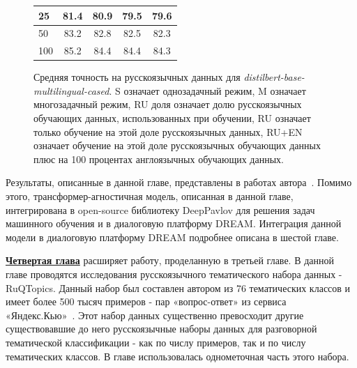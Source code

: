 \begin{figure}[!htbp]
\begin{minipage}{0.45\textwidth}
{{\begin{tabular}[baseline={(0,2.1)}]{|l||c|c|c|c|}
25 & 81.4 & 80.9 & 79.5 & 79.6 \\ \hline
50 & 83.2 & 82.8 & 82.5 & 82.3 \\ \hline
100 & 85.2 & 84.4 & 84.4 & 84.3 \\ \hline
\end{tabular}}
}
\end{minipage}
\caption{Средняя точность на русскоязычных данных для \textit{distilbert-base-multilingual-cased}. S означает однозадачный режим, M означает многозадачный режим, RU доля означает долю русскоязычных обучающих данных, использованных при обучении, RU означает только обучение на этой доле русскоязычных данных, RU+EN означает обучение на этой доле русскоязычных обучающих данных плюс на 100 процентах англоязычных обучающих данных.}
\label{fig:tr-ag:ru_dialog_part}
\end{figure}

Результаты, описанные в данной главе, представлены в работах автора~\cite{rumtl,enmtl}. Помимо этого, трансформер-агностичная модель, описанная в данной главе, интегрирована в open-source библиотеку DeepPavlov для решения задач машинного обучения и в диалоговую платформу DREAM. Интеграция данной модели в диалоговую платформу DREAM подробнее описана в {шестой главе}.

\underline{\textbf{Четвертая глава}} расширяет работу, проделанную в {третьей главе}. В данной главе проводятся исследования русскоязычного тематического набора данных - RuQTopics.  Данный набор был составлен автором из 76 тематических классов и имеет более 500 тысяч примеров - пар «вопрос-ответ» из сервиса «Яндекс.Кью»~\cite{yandex_q}. Этот набор данных существенно превосходит другие существовавшие до него русскоязычные наборы данных для разговорной тематической классификации - как по числу примеров, так и по числу тематических классов. В главе использовалась однометочная часть этого набора. 

